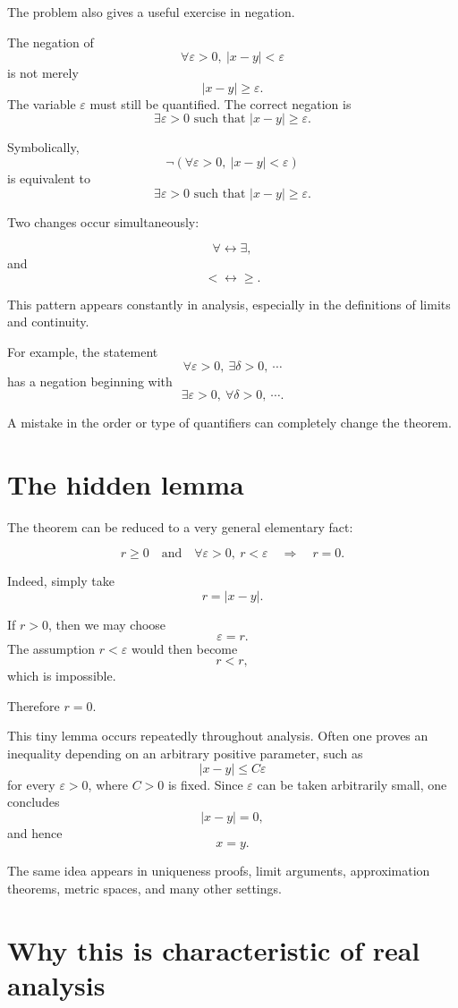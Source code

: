 \documentclass{essay}
\begin{document}
The problem also gives a useful exercise in negation.

The negation of
\[
\forall \varepsilon>0,\ |x-y|<\varepsilon
\]
is not merely
\[
|x-y|\ge\varepsilon.
\]
The variable \(\varepsilon\) must still be quantified. The correct negation is
\[
\exists \varepsilon>0
\text{ such that }
|x-y|\ge\varepsilon.
\]

Symbolically,
\[
\neg
\left(
\forall \varepsilon>0,\ |x-y|<\varepsilon
\right)
\]
is equivalent to
\[
\exists \varepsilon>0
\text{ such that }
|x-y|\ge\varepsilon.
\]

Two changes occur simultaneously:

\[
\forall \longleftrightarrow \exists,
\]
and
\[
< \longleftrightarrow \ge.
\]

This pattern appears constantly in analysis, especially in the definitions of limits and continuity.

For example, the statement
\[
\forall \varepsilon>0,\ \exists \delta>0,\ \cdots
\]
has a negation beginning with
\[
\exists \varepsilon>0,\ \forall \delta>0,\ \cdots.
\]

A mistake in the order or type of quantifiers can completely change the theorem.

\section{The hidden lemma}

The theorem can be reduced to a very general elementary fact:

\[
r\ge0
\quad\text{and}\quad
\forall \varepsilon>0,\ r<\varepsilon
\quad\Longrightarrow\quad
r=0.
\]

Indeed, simply take
\[
r=|x-y|.
\]

If \(r>0\), then we may choose
\[
\varepsilon=r.
\]
The assumption \(r<\varepsilon\) would then become
\[
r<r,
\]
which is impossible.

Therefore \(r=0\).

This tiny lemma occurs repeatedly throughout analysis. Often one proves an inequality depending on an arbitrary positive parameter, such as
\[
|x-y|\le C\varepsilon
\]
for every \(\varepsilon>0\), where \(C>0\) is fixed. Since \(\varepsilon\) can be taken arbitrarily small, one concludes
\[
|x-y|=0,
\]
and hence
\[
x=y.
\]

The same idea appears in uniqueness proofs, limit arguments, approximation theorems, metric spaces, and many other settings.

\section{Why this is characteristic of real analysis}
\end{document}
